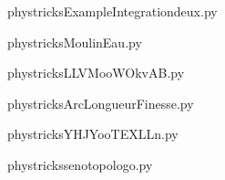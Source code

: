     \newcommand{\CaptionFigExampleIntegrationdeux}{<+Type your caption here+>}
    \begin{center}
        
    \end{center}
    phystricksExampleIntegrationdeux.py

    

    \clearpage
    


    \newcommand{\CaptionFigMoulinEau}{<+Type your caption here+>}
    \begin{center}
        
    \end{center}
    phystricksMoulinEau.py

    

    \clearpage
    


    \newcommand{\CaptionFigLLVMooWOkvAB}{<+Type your caption here+>}
    \begin{center}
        
    \end{center}
    phystricksLLVMooWOkvAB.py

    

    \clearpage
    


    \newcommand{\CaptionFigArcLongueurFinesse}{<+Type your caption here+>}
    \begin{center}
        
    \end{center}
    phystricksArcLongueurFinesse.py

    

    \clearpage
    


    \newcommand{\CaptionFigYHJYooTEXLLn}{<+Type your caption here+>}
    \begin{center}
        
    \end{center}
    phystricksYHJYooTEXLLn.py

    

    \clearpage
    


    \newcommand{\CaptionFigsenotopologo}{<+Type your caption here+>}
    \begin{center}
        
    \end{center}
    phystrickssenotopologo.py

